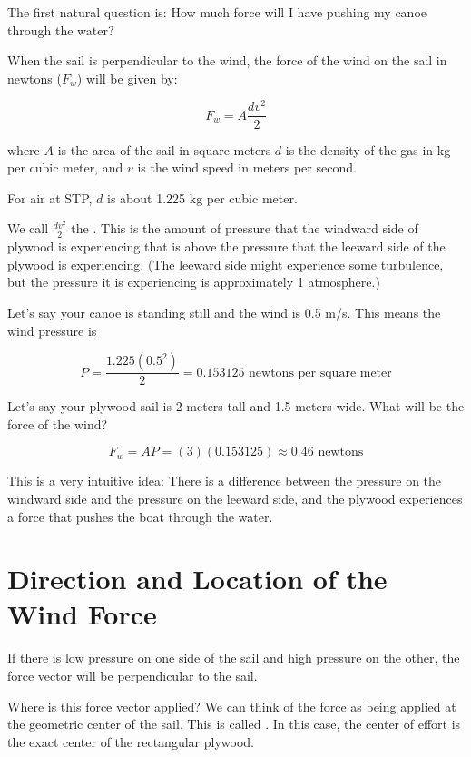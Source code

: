 The first natural question is: How much force will I have pushing my canoe through the water?
\begin{mdframed}[style=important, frametitle={Wind Force}]

When the sail is perpendicular to the wind,  the force of the wind on the sail in newtons ($F_w$) will be given by:

$$F_w = A \frac{d v^2}{2}$$

where $A$ is the area of the sail in square meters  $d$ is the density of the gas in kg per cubic meter, and $v$ is the wind speed in meters per second.

For air at STP,  $d$ is about 1.225 kg per cubic meter.

We call $\frac{d v^2}{2}$  the .  This is the amount of pressure that the windward side of plywood is experiencing that is above the 
 pressure that the leeward side of the plywood is experiencing.  (The leeward side might experience some turbulence,  but the pressure it is experiencing is 
 approximately 1 atmosphere.)

\end{mdframed}

Let's say your canoe is standing still and the wind is 0.5 m/s.  This means the wind pressure is

$$P =  \frac{1.225 (0.5^2)}{2} =  0.153125 \text{ newtons per square meter}$$

Let's say your plywood sail is 2 meters tall and 1.5 meters wide.  What will be the force of the wind?

$$F_w  = A P = (3)(0.153125) \approx 0.46 \text{ newtons}$$

This is a very intuitive idea: There is a difference between the pressure on the windward side and the pressure on the leeward side, and the plywood experiences a force that pushes
the boat through the water.


\section{Direction and Location of the Wind Force}

If there is low pressure on one side of the sail and high pressure on the other,  the force vector will be perpendicular to the sail. 
 
Where is this force vector applied?  We can think of the force as being applied at the geometric center of the sail.  This is called . In this case,  the center of effort is the exact center of the rectangular plywood.

